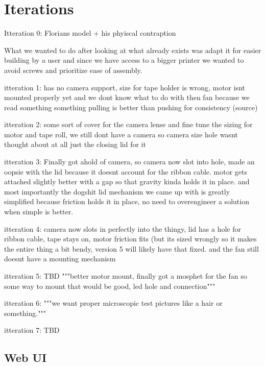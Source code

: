 \chapter{Iterations}\label{ch:iterations}


Itteration 0: Florians model + his phyiscal contraption

What we wanted to do after looking at what already exists was adapt it for easier building by a user and since we have access to a bigger printer we wanted to avoid screws and prioritize ease of assembly.




itteration 1: has no camera support, size for tape holder is wrong, motor isnt mounted properly yet and we dont know what to do with then fan because we read something something pulling is better than pushing for consistency (source)


itteration 2: some sort of cover for the camera lense and fine tune the sizing for motor and tape roll, we still dont have a camera so camera size hole wasnt thought about at all just the closing lid for it


itteration 3: Finally got ahold of camera, so camera now slot into hole, made an oopsie with the lid because it doesnt account for the ribbon cable. motor gets attached slightly better with a gap so that gravity kinda holds it in place. and most importantly the dogshit lid mechanism we came up with is greatly simplified because friction holds it in place, no need to overengineer a solution when simple is better.


itteration 4: camera now slots in perfectly into the thingy, lid has a hole for ribbon cable, tape stays on, motor friction fits (but its sized wrongly so it makes the entire thing a bit bendy, version 5 will likely have that fixed. and the fan still doesnt have a mounting mechanism


itteration 5: TBD 
"""better motor mount, finally got a mosphet for the fan so some way to mount that would be good, led hole and connection"""


itteration 6: """we want proper microscopic test pictures like a hair or something."""


itteration 7: TBD




\section{Web UI}

